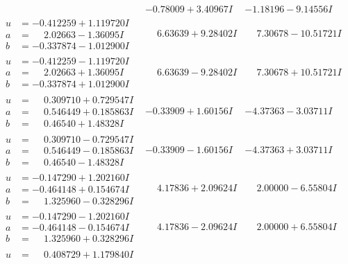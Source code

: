 \documentclass[1p]{elsarticle_modified}
\theoremstyle{definition}
\begin{document}
$$\begin{array}{c|c|c}
 & -0.78009 + 3.40967 I & -1.18196 - 9.14556 I \\ \hline\begin{aligned}
u &= -0.412259 + 1.119720 I \\
a &= \phantom{-}2.02663 - 1.36095 I \\
b &= -0.337874 - 1.012900 I\end{aligned}
 & \phantom{-}6.63639 + 9.28402 I & \phantom{-}7.30678 - 10.51721 I \\ \hline\begin{aligned}
u &= -0.412259 - 1.119720 I \\
a &= \phantom{-}2.02663 + 1.36095 I \\
b &= -0.337874 + 1.012900 I\end{aligned}
 & \phantom{-}6.63639 - 9.28402 I & \phantom{-}7.30678 + 10.51721 I \\ \hline\begin{aligned}
u &= \phantom{-}0.309710 + 0.729547 I \\
a &= \phantom{-}0.546449 + 0.185863 I \\
b &= \phantom{-}0.46540 + 1.48328 I\end{aligned}
 & -0.33909 + 1.60156 I & -4.37363 - 3.03711 I \\ \hline\begin{aligned}
u &= \phantom{-}0.309710 - 0.729547 I \\
a &= \phantom{-}0.546449 - 0.185863 I \\
b &= \phantom{-}0.46540 - 1.48328 I\end{aligned}
 & -0.33909 - 1.60156 I & -4.37363 + 3.03711 I \\ \hline\begin{aligned}
u &= -0.147290 + 1.202160 I \\
a &= -0.464148 + 0.154674 I \\
b &= \phantom{-}1.325960 - 0.328296 I\end{aligned}
 & \phantom{-}4.17836 + 2.09624 I & \phantom{-}2.00000 - 6.55804 I \\ \hline\begin{aligned}
u &= -0.147290 - 1.202160 I \\
a &= -0.464148 - 0.154674 I \\
b &= \phantom{-}1.325960 + 0.328296 I\end{aligned}
 & \phantom{-}4.17836 - 2.09624 I & \phantom{-}2.00000 + 6.55804 I \\ \hline\begin{aligned}
u &= \phantom{-}0.408729 + 1.179840 I \\

\end{aligned}
\end{array}$$
\end{document}
